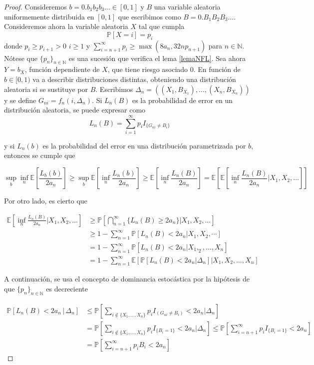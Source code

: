 \begin{proof}

Consideremos $b=0.b_1b_2b_3\ldots \in [0,1]$ y $B$ una variable aleatoria uniformemente distribuida en $[0,1]$ que escribimos como $B=0.B_1B_2B_3\ldots$. Consideremos ahora la variable aleatoria $X$ tal que cumpla 
$$\mathbb{P}[X=i]=p_i$$
donde $p_i \geq p_{i+1} > 0$ $i\geq 1$ y $\sum_{i=n+1}^{\infty} p_i \geq \max(8a_n,32np_{n+1})$ para $n \in \mathbb{N}$. Nótese que $\{p_n\}_{n \in \mathbb{N}}$ es una sucesión que verifica el lema \ref{lemaNFL}. Sea ahora $Y=b_X$, función dependiente de $X$,  que tiene riesgo asociado $0$. En función de $b \in [0,1)$ va a describir distribuciones distintas, obteniendo una distribución aleatoria si se sustituye por $B$. Escribimos $\Delta_n = ((X_1,B_{X_1}),\ldots,(X_n,B_{X_n}))$ y se define $G_{ni} = f_n(i,\Delta_n)$. Si $L_n(B)$ es la probabilidad de error en un distribución aleatoria, se puede expresar como
$$L_n(B)=\sum_{i=1}^{\infty} p_iI_{\{G_{ni} \neq B_i\}}$$

y si $L_n(b)$ es la probabilidad del error en una distribución parametrizada por $b$, entonces se cumple que

$$\sup_{b} \inf_{n} \mathbb{E} \left[ \frac{L_b(b)}{2a_n} \right] \geq \sup_{b}\mathbb{E}\left[\inf_{n}\frac{L_n(b)}{2a_n}\right] \geq \mathbb{E}\left[\inf_{n}\frac{L_n(B)}{2a_n}\right] = \mathbb{E}\left[\mathbb{E}\left[\inf_{n}\frac{L_n(B)}{2a_n} \bigg| X_1,X_2,\ldots\right]\right]$$

Por otro lado, es cierto que

\begin{align*}
\mathbb{E}\left[ \inf_{n}\frac{L_n(B)}{2a_n} \bigg| X_1,X_2,\ldots \right] &\geq \mathbb{P} \left[ \bigcap_{n=1}^{\infty} \{L_n(B) \geq 2a_n\} \bigg| X_1,X_2,\ldots \right] \\
&\geq 1 - \sum_{n=1}^{\infty} \mathbb{P}\left[ L_n(B) < 2a_n \bigg| X_1,X_2,\cdots \right] \\
&= 1 - \sum_{n=1}^{\infty} \mathbb{P}\left[ L_n(B) < 2a_n \bigg| X_1,_2,\ldots, X_n \right] \\
&= 1 - \sum_{n=1}^{\infty} \mathbb{E} \left[ \mathbb{P} \left[ L_n(B) < 2a_n \bigg| \Delta_n \right] \bigg| X_1,X_2,\ldots,X_n \right]
\end{align*}

A continuación, se usa el concepto de dominancia estocástica por la hipótesis de que $\{p_n\}_{n \in \mathbb{N}}$ es decreciente

\begin{align*}
\mathbb{P}\left[ L_n(B) < 2a_n \,|\, \Delta_n \right] &\leq \mathbb{P} \left[ \sum_{i \notin \{X_1,\ldots,X_n\}} p_i I_{(G_{ni} \neq B_i)} < 2a_n \bigg| \Delta_n \right] \\
&= \mathbb{P}\left[ \sum_{i \notin \{X_1,\ldots,X_n\}} p_iI_{\{B_i=1\}} < 2a_n \bigg| \Delta_n \right] \leq \mathbb{P}\left[ \sum_{i=n+1}^{\infty}  p_iI_{\{B_i=1\}} < 2a_n \right] \\ &= \mathbb{P}\left[ \sum_{i=n+1}^{\infty} p_iB_i < 2a_n \right]
\end{align*}


\end{proof}
